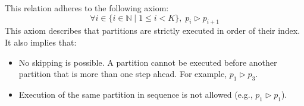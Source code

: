 \begin{description}
    This relation adheres to the following axiom:
    \begin{equation}
        \forall i \in \{i \in \mathbb{N} \mid 1 \leq i < K \}, \; p_i \triangleright p_{i+1}
    \end{equation}
    This axiom describes that partitions are strictly executed in order of their index. It also implies that:
    \begin{itemize}
        \item No skipping is possible. A partition cannot be executed before another partition that is more than one step ahead. For example, $p_1 \triangleright p_3$.
        \item Execution of the same partition in sequence is not allowed (e.g., $p_1 \triangleright p_1$).
    \end{itemize}

\end{description}
